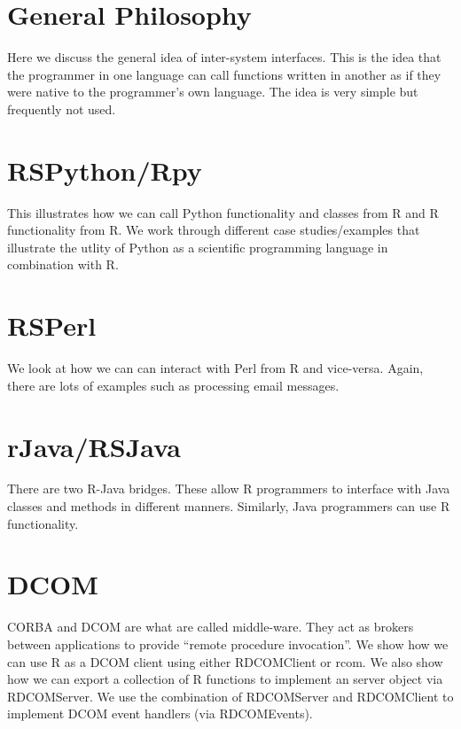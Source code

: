 \documentclass[11pt]{book}
\begin{document}
 \section{General Philosophy}
Here we discuss the general idea of inter-system interfaces.
This is the idea that the programmer in one language can call
functions written in another as if they were  native to the programmer's own
language.  The idea is very simple but frequently not used. 


 \section{RSPython/Rpy}
 This illustrates how we can call Python functionality and classes
 from R and R functionality from R.  We work through different case
 studies/examples that illustrate the utlity of Python as a scientific
 programming language in combination with R.
 \section{RSPerl}
  We look at how we can can interact with Perl from R and vice-versa.
  Again, there are lots of examples such as processing email messages.
 \section{rJava/RSJava}
  There are two R-Java  bridges. These allow R programmers to
  interface with Java classes and methods in different  manners.
  Similarly, Java programmers can use R functionality.

 \section{DCOM}
 CORBA and DCOM are what are called middle-ware.  They act as brokers
 between applications to provide ``remote procedure invocation''.  We
 show how we can use R as a DCOM client using either RDCOMClient or
 rcom.  We also show how we can export a collection of R functions to
 implement an server object via RDCOMServer.  We use the combination
 of RDCOMServer and RDCOMClient to implement DCOM event handlers (via
 RDCOMEvents).


\end{document}
